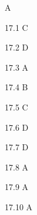 \begin{Solution}{17}
A
\end{Solution}
\begin{Solution}{17.{1}}
C
\end{Solution}
\begin{Solution}{17.{2}}
D
\end{Solution}
\begin{Solution}{17.{3}}
A
\end{Solution}
\begin{Solution}{17.{4}}
B
\end{Solution}
\begin{Solution}{17.{5}}
C
\end{Solution}
\begin{Solution}{17.{6}}
D
\end{Solution}
\begin{Solution}{17.{7}}
D
\end{Solution}
\begin{Solution}{17.{8}}
A
\end{Solution}
\begin{Solution}{17.{9}}
A
\end{Solution}
\begin{Solution}{17.{10}}
A
\end{Solution}
